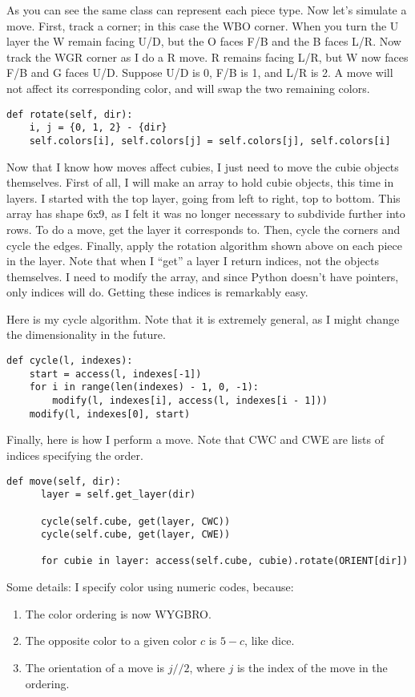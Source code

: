 \documentclass[11pt, oneside]{article}
\begin{document}
As you can see the same class can represent each piece type. Now let's simulate
a move. First, track a corner; in this case the WBO corner. When you turn the
U layer the W remain facing U/D, but the O faces F/B and the B faces L/R. Now
track the WGR corner as I do a R move. R remains facing L/R, but W now faces
F/B and G faces U/D. Suppose U/D is 0, F/B is 1, and L/R is 2. A move will not
affect its corresponding color, and will swap the two remaining colors.

\begin{verbatim}
def rotate(self, dir):
    i, j = {0, 1, 2} - {dir}
    self.colors[i], self.colors[j] = self.colors[j], self.colors[i]
\end{verbatim}

Now that I know how moves affect cubies, I just need to move the cubie objects
themselves. First of all, I will make an array to hold cubie objects, this
time in layers. I started with the top layer, going from left to right, top
to bottom. This array has shape 6x9, as I felt it was no longer necessary
to subdivide further into rows. To do a move, get the layer it corresponds
to. Then, cycle the corners and cycle the edges. Finally, apply the rotation
algorithm shown above on each piece in the layer. Note that when I ``get''
a layer I return indices, not the objects themselves. I need to modify the
array, and since Python doesn't have pointers, only indices will do. Getting
these indices is remarkably easy.

Here is my cycle algorithm. Note that it is extremely
general, as I might change the dimensionality in the future.
\begin{verbatim}
def cycle(l, indexes):
    start = access(l, indexes[-1])
    for i in range(len(indexes) - 1, 0, -1):
        modify(l, indexes[i], access(l, indexes[i - 1]))
    modify(l, indexes[0], start)
\end{verbatim}

Finally, here is how I perform a move. Note that CWC
and CWE are lists of indices specifying the order.
\begin{verbatim}
def move(self, dir):
      layer = self.get_layer(dir)

      cycle(self.cube, get(layer, CWC))
      cycle(self.cube, get(layer, CWE))

      for cubie in layer: access(self.cube, cubie).rotate(ORIENT[dir])
\end{verbatim}

Some details: I specify color using numeric codes, because:
\begin{enumerate}
  \item The color ordering is now WYGBRO.
  \item The opposite color to a given color \( c \) is \( 5 - c \), like dice.
  \item The orientation of a move is \( j//2 \), where \( j \) is the index of the move in the ordering.
\end{enumerate}
\end{document}
